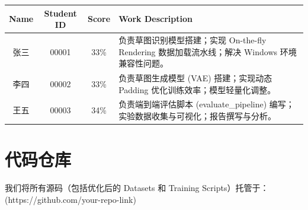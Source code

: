 \documentclass{sjtuarticle}
\begin{document}
\begin{table}[H]
\centering
\begin{tabular}{|c|c|c|p{8cm}|}
\hline
Name & Student ID & Score & Work Description \\ \hline
张三 & 00001 & 33\% & 负责草图识别模型搭建；实现 On-the-fly Rendering 数据加载流水线；解决 Windows 环境兼容性问题。 \\ \hline
李四 & 00002 & 33\% & 负责草图生成模型 (VAE) 搭建；实现动态 Padding 优化训练效率；模型轻量化调整。 \\ \hline
王五 & 00003 & 34\% & 负责端到端评估脚本 (evaluate\_pipeline) 编写；实验数据收集与可视化；报告撰写与分析。 \\ \hline
\end{tabular}
\end{table}

\section*{代码仓库}
我们将所有源码（包括优化后的 Datasets 和 Training Scripts）托管于：\\
(https://github.com/your-repo-link)
\end{document}
